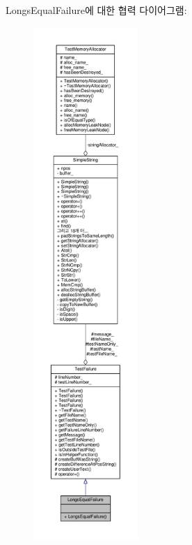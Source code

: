 Longs\+Equal\+Failure에 대한 협력 다이어그램\+:
\nopagebreak
\begin{figure}[H]
\begin{center}
\leavevmode
\includegraphics[height=550pt]{class_longs_equal_failure__coll__graph}
\end{center}
\end{figure}
